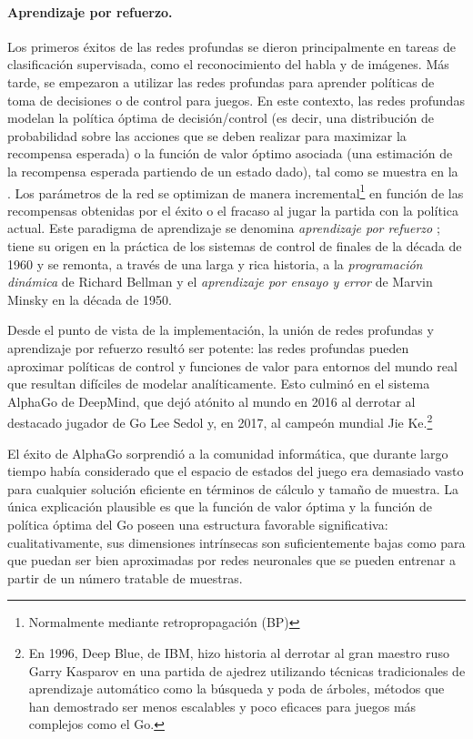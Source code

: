 \documentclass[../../book-main_es.tex]{subfiles}
\begin{document}
\paragraph{Aprendizaje por refuerzo.}
Los primeros éxitos de las redes profundas se dieron principalmente en tareas de clasificación supervisada,
como el reconocimiento del habla y de imágenes. Más tarde, se empezaron a
utilizar las redes profundas para aprender políticas de toma de decisiones o de control para juegos.
En este contexto, las redes profundas modelan la política óptima 
de decisión/control (es decir, una distribución de probabilidad sobre
las acciones que se deben realizar para maximizar la recompensa esperada) o la
función de valor óptimo asociada (una estimación de la recompensa esperada
partiendo de un estado dado), tal como se muestra en la .
Los parámetros de la red se optimizan de manera incremental\footnote{Normalmente mediante
retropropagación (BP)} en función de las recompensas obtenidas por el éxito o
el fracaso al jugar la partida con la política actual. Este paradigma de aprendizaje
se denomina \textit{aprendizaje por refuerzo} \cite{Sutton-Barto}; tiene su origen en 
la práctica de los sistemas de control de finales de la década de 1960 
\cite{Waltz1965AHA,Mendel1970ReinforcementlearningCA} y se remonta, a través 
de una larga y rica historia, a la \textit{programación dinámica} de Richard Bellman \cite{Bellman-DP} y el
\textit{aprendizaje por ensayo y error} \cite{Minsky-1954} de Marvin Minsky en la década de 1950.

Desde el punto de vista de la implementación, la unión de redes profundas y
aprendizaje por refuerzo resultó ser potente: las redes profundas pueden aproximar
políticas de control y funciones de valor para entornos del mundo real que
resultan difíciles de modelar analíticamente. Esto culminó en el sistema
AlphaGo de DeepMind, que dejó atónito al mundo en 2016 al derrotar al destacado jugador de Go
Lee Sedol y, en 2017, al campeón mundial Jie Ke.\footnote{En
    1996, Deep Blue, de IBM, hizo historia al derrotar al gran maestro ruso
    Garry Kasparov en una partida de ajedrez utilizando técnicas tradicionales de aprendizaje automático
    como la búsqueda y poda de árboles, métodos que han demostrado ser menos
escalables y poco eficaces para juegos más complejos como el Go.}

El éxito de AlphaGo sorprendió a la comunidad informática, que durante largo
tiempo había considerado que el espacio de estados del juego era demasiado vasto
para cualquier solución eficiente en términos de cálculo y tamaño de muestra. La
única explicación plausible es que la función de valor óptima y la función de política óptima del Go
poseen una estructura favorable significativa: cualitativamente, sus dimensiones 
intrínsecas son suficientemente bajas como para que puedan ser bien aproximadas por 
redes neuronales que se pueden entrenar a partir de un número tratable de muestras.
\end{document}
